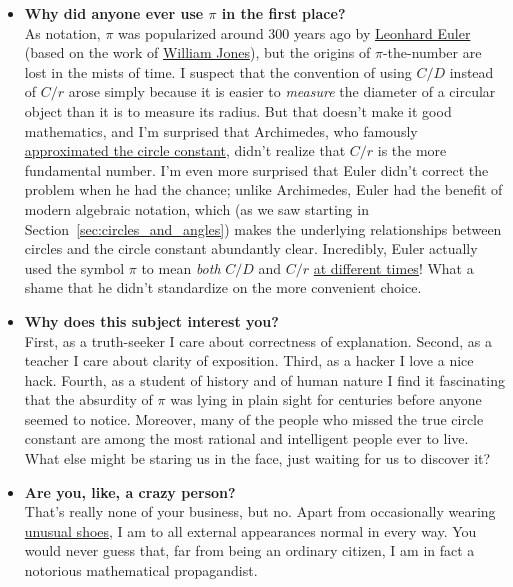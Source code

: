 \begin{itemize}
  \item \textbf{Why did anyone ever use $\pi$ in the first place?} \\ As notation, $\pi$ was popularized around 300 years ago by \href{https://en.wikipedia.org/wiki/Leonhard_Euler}{Leonhard Euler} (based on the work of \href{https://en.wikipedia.org/wiki/William_Jones_(mathematician)}{William Jones}), but the origins of $\pi$-the-number are lost in the mists of time. I suspect that the convention of using $C/D$ instead of $C/r$ arose simply because it is easier to \emph{measure} the diameter of a circular object than it is to measure its radius. But that doesn't make it good mathematics, and I'm surprised that Archimedes, who famously \href{http://itech.fgcu.edu/faculty/clindsey/mhf4404/archimedes/archimedes.html}{approximated the circle constant}, didn't realize that $C/r$ is the more fundamental number. I'm even more surprised that Euler didn't correct the problem when he had the chance; unlike Archimedes, Euler had the benefit of modern algebraic notation, which (as we saw starting in Section~\ref{sec:circles_and_angles}) makes the underlying relationships between circles and the circle constant abundantly clear. Incredibly, Euler actually used the symbol $\pi$ to mean \emph{both} $C/D$ and $C/r$ \href{https://en.wikipedia.org/wiki/Pi#Adoption_of_the_symbol_%CF%80}{at different times}! What a shame that he didn't standardize on the more convenient choice.

  \item \textbf{Why does this subject interest you?} \\ First, as a truth-seeker I care about correctness of explanation. Second, as a teacher I care about clarity of exposition. Third, as a hacker I love a nice hack. Fourth, as a student of history and of human nature I find it fascinating that the absurdity of $\pi$ was lying in plain sight for centuries before anyone seemed to notice. Moreover, many of the people who missed the true circle constant are among the most rational and intelligent people ever to live. What else might be staring us in the face, just waiting for us to discover it?

  \item \textbf{Are you, like, a crazy person?} \\ That's really none of your business, but no. Apart from occasionally wearing \href{https://en.wikipedia.org/wiki/Vibram_FiveFingers}{unusual shoes}, I am to all external appearances normal in every way. You would never guess that, far from being an ordinary citizen, I am in fact a notorious mathematical propagandist.


\end{itemize}
